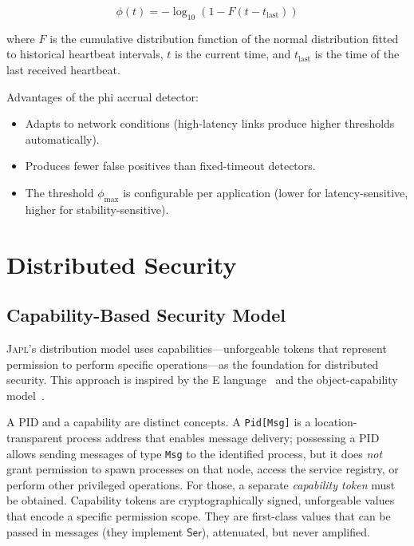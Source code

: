 \documentclass[11pt,a4paper]{article}
\newcommand{\japl}{\textsc{Japl}}
\newcommand{\Ser}{\mathsf{Ser}}
\begin{document}
\[
  \phi(t) = -\log_{10}\left(1 - F(t - t_{\text{last}})\right)
\]

where $F$ is the cumulative distribution function of the normal
distribution fitted to historical heartbeat intervals, $t$ is the current
time, and $t_{\text{last}}$ is the time of the last received heartbeat.

Advantages of the phi accrual detector:
\begin{itemize}[nosep]
  \item Adapts to network conditions (high-latency links produce higher
        thresholds automatically).
  \item Produces fewer false positives than fixed-timeout detectors.
  \item The threshold $\phi_{\text{max}}$ is configurable per application
        (lower for latency-sensitive, higher for stability-sensitive).
\end{itemize}


\section{Distributed Security}
\label{sec:security}

\subsection{Capability-Based Security Model}

\japl{}'s distribution model uses capabilities---unforgeable tokens that
represent permission to perform specific operations---as the foundation for
distributed security. This approach is inspired by the E
language~\citep{miller2006robust} and the object-capability
model~\citep{dennis1966programming,miller2003capability}.

A PID and a capability are distinct concepts. A \texttt{Pid[Msg]} is a
location-transparent process address that enables message delivery; possessing
a PID allows sending messages of type \texttt{Msg} to the identified process,
but it does \emph{not} grant permission to spawn processes on that node,
access the service registry, or perform other privileged operations. For those,
a separate \emph{capability token} must be obtained. Capability tokens are
cryptographically signed, unforgeable values that encode a specific permission
scope. They are first-class values that can be passed in messages (they
implement $\Ser$), attenuated, but never amplified.
\end{document}
